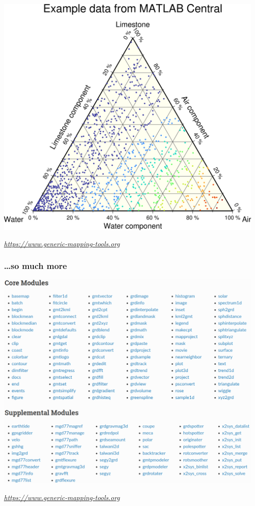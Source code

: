 \documentclass[unknownkeysallowed]{beamer}
\begin{document}
\begin{frame}
\frametitle{}
	\begin{center}
		\includegraphics[width=.8\textwidth]{../figures/gmt_ternary_map.png}	
	\end{center}
	\vspace{-0.35cm}
	\begin{flushright}
	\tiny{\emph{\url{https://www.generic-mapping-tools.org}}}
	\end{flushright}	
\end{frame}

\begin{frame}
\frametitle{\dots so much more}
	\begin{center}
		\includegraphics[width=.8\textwidth]{../figures/gmt_modules.png}	
	\end{center}
	\vspace{-0.35cm}
	\begin{flushright}
	\tiny{\emph{\url{https://www.generic-mapping-tools.org}}}
	\end{flushright}	
\end{frame}
\end{document}
